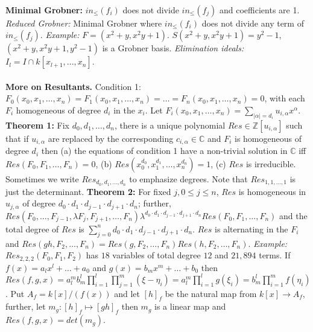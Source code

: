 \\
{\bf Minimal Grobner:}
$in_{\leq}(f_i)$ does not divide
$in_{\leq}(f_j)$ and coefficients are 1.  \emph{Reduced Grobner:} Minimal Grobner where
$in_{\leq}(f_i)$ does not divide any term of $in_{\leq}(f_j)$.
\emph{Example:} $F=(x^2+y, x^2y+1)$.  $S(x^2+y, x^2y+1)= y^2-1$,
$(x^2+y, x^2y+1, y^2-1)$ is a Grobner basis.
\emph{Elimination ideals:} $I_l = I \cap k[ x_{l+1} , ..., x_{n} ]$.
\\
\\
{\bf More on Resultants.} Condition 1: 
$F_{0}(x_0 , x_1 , \ldots , x_n) = F_{1}(x_0 , x_1 , \ldots , x_n) =
\ldots = F_{n}(x_0 , x_1 , \ldots , x_n)=0 $, 
with each $F_i$ homogeneous of degree
$d_i$ in the $x_i$.  Let $F_i (x_0 , x_1 , \ldots , x_n)= \sum_{|\alpha|= d_i} 
u_{i, \alpha} x^{\alpha}$.
{\bf Theorem 1:} Fix $d_0 , d_1 , \ldots , d_n$, there is a unique polynomial
$Res \in {\mathbb Z} [ u_{i, \alpha}]$ such that if $u_{i,\alpha}$ are replaced by the 
corresponding $c_{i,\alpha} \in {\mathbb C}$
and $F_i$ is homogeneous of degree $d_i$ then (a) the equations of condition 1 have a 
non-trivial solution in ${\mathbb C}$ iff $Res(F_0 , F_1 , \ldots , F_n)=0$, (b)
$Res( x_0^{d_0}, x_1^{d_1}, \ldots , x_n^{d_n}) = 1$, (c) $Res$ is irreducible.  
Sometimes we write 
$Res_{d_0 , d_1 , \ldots , d_n}$ to emphasize degrees.
Note that $Res_{1,1, \ldots , 1}$ is just the determinant.
{\bf Theorem 2:} For fixed $j, 0 \le j \le n$, $Res$ is homogeneous in $u_{j, \alpha}$
of degree $d_0 \cdot d_1 \cdot d_{j-1} \cdot d_{j+1} \cdot d_n$; further,
$Res(F_0, \ldots , F_{j-1} , \lambda F_j , F_{j+1}, \ldots, F_n)
\lambda^{ d_0 \cdot d_1 \cdot d_{j-1} \cdot d_{j+1} \cdot d_n}
Res(F_0, F_1 , \ldots , F_n)$ and the total degree of $Res$ is $\sum_{j=0}^n
d_0 \cdot d_1 \cdot d_{j-1} \cdot d_{j+1} \cdot d_n$.  $Res$ is alternating in the
$F_i$ and 
$Res(gh , F_2, \ldots, F_n) = Res(g , F_2, \ldots, F_n) Res(h , F_2, \ldots, F_n)$.
\emph{Example:}
$Res_{2,2,2} (F_0 , F_1 , F_2)$ has $18$ variables of total degree 
$12$ and $21,894$ terms.  
If $f(x)= a_l x^l + \ldots + a_0$ and
$g(x)= b_m x^m + \ldots + b_0$ then
$Res(f,g,x)= a_l^m b_m^l \prod_{i=1}^l \prod_{j=1}^m (\xi-\eta_i)= 
a_l^m \prod_{i=1}^l g(\xi_i)=
b_m^l \prod_{i=1}^m f(\eta_i)$.  Put $A_f= k[x]/(f(x))$ and let $[h]_f$ be
the natural map from $k[x] \rightarrow A_f$, further, let
$m_g: [h]_f \mapsto [gh]_f$ then $m_g$ is a linear map and $Res(f,g,x)= det(m_g)$.
